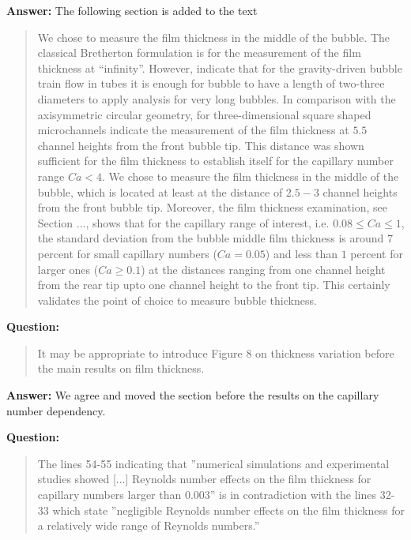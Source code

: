 \documentclass{article}
\begin{document}
\textbf{Answer:} The following section is added to the text 
\begin{quotation}
We chose to measure the film thickness in the middle of the bubble. The
classical Bretherton formulation is for the measurement of the film thickness at ``infinity''.
However, \citet{cerro-bubble-train} indicate that for the gravity-driven bubble train flow in tubes
it is enough for bubble to have a length of two-three diameters to apply analysis for very long
bubbles. In comparison with the axisymmetric circular geometry, for three-dimensional square shaped
microchannels \citet{heil-threedim} indicate the measurement of the film thickness at $5.5$
channel heights from the front bubble tip. This distance was shown sufficient for the
film thickness to establish itself for the capillary number range $Ca<4$. We chose to measure
the film thickness in the middle of the bubble, which is located at least at the distance of $2.5-3$
channel heights from the front bubble tip.  Moreover, the film thickness examination, see Section
..., shows that for the capillary range of interest, i.e.
$0.08\leq Ca \leq 1$, the standard deviation from the bubble middle film thickness is around $7$
 percent for small capillary numbers ($Ca=0.05$) and less than $1$ percent for larger ones
($Ca \geq 0.1$) at the distances ranging from one channel height from the rear tip upto one channel
height to the front tip. This certainly validates the point of choice to measure bubble thickness.
\end{quotation}
 
\textbf{Question:}
\begin{quotation}
It may be appropriate to introduce Figure 8 on thickness variation before the main results on ﬁlm
thickness.
\end{quotation}

\textbf{Answer:} We agree and moved the section before the results on the capillary number
dependency.


\textbf{Question:}
\begin{quotation}
The lines 54-55 indicating that ”numerical simulations and experimental studies showed [...]
Reynolds
number effects on the ﬁlm thickness for capillary numbers larger than 0.003” is in contradiction
with
the lines 32-33 which state ”negligible Reynolds number effects on the film thickness for a
relatively
wide range of Reynolds numbers.”
\end{quotation}
\end{document}

